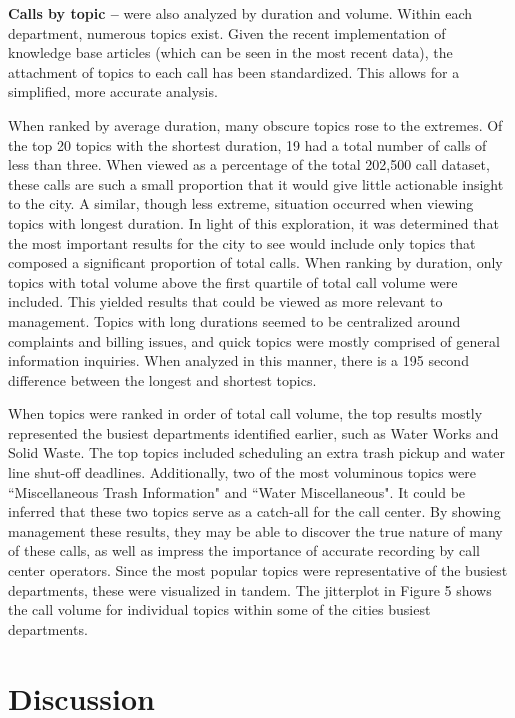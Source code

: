 \documentclass{article}
\begin{document}
\textbf{Calls by topic --} were also analyzed by duration and volume.  Within each department, numerous topics exist.  Given the recent implementation of knowledge base articles (which can be seen in the most recent data), the attachment of topics to each call has been standardized.  This allows for a simplified, more accurate analysis.
\par
When ranked by average duration, many obscure topics rose to the extremes.  Of the top 20 topics with the shortest duration, 19 had a total number of calls of less than three.  When viewed as a percentage of the total 202,500 call dataset, these calls are such a small proportion that it would give little actionable insight to the city.  A similar, though less extreme, situation occurred when viewing topics with longest duration.  In light of this exploration, it was determined that the most important results for the city to see would include only topics that composed a significant proportion of total calls.  When ranking by duration, only topics with total volume above the first quartile of total call volume were included.  This yielded results that could be viewed as more relevant to management.  Topics with long durations seemed to be centralized around complaints and billing issues, and quick topics were mostly comprised of general information inquiries.  When analyzed in this manner, there is a 195 second difference between the longest and shortest topics. %
\par
When topics were ranked in order of total call volume, the top results mostly represented the busiest departments identified earlier, such as Water Works and Solid Waste. The top topics included scheduling an extra trash pickup and water line shut-off deadlines.  Additionally, two of the most voluminous topics were ``Miscellaneous Trash Information" and ``Water Miscellaneous".  It could be inferred that these two topics serve as a catch-all for the call center.  By showing management these results, they may be able to discover the true nature of many of these calls, as well as impress the importance of accurate recording by call center operators.  Since the most popular topics were representative of the busiest departments, these were visualized in tandem.  The jitterplot in Figure 5 shows the call volume for individual topics within some of the cities busiest departments.

\section{Discussion}
\end{document}
